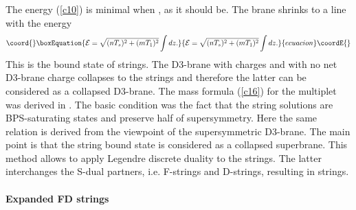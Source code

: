 \documentclass[a4paper,12pt]{article}
\begin{document}
The energy (\ref{c10}) is minimal when \coordHE{}, as it should be. The brane 
shrinks to a line with the energy
\begin{equation}\coord{}\boxEquation{
{\cal E}=\sqrt{(nT_s)^2+(mT_1)^2}\int dz.
\label{c16}
}{
{\cal E}=\sqrt{(nT_s)^2+(mT_1)^2}\int dz.
}{ecuacion}\coordE{}\end{equation}
This is the bound state of \coordHE{} strings. The D3-brane with charges \coordHE{} 
and with no net D3-brane charge collapses to the \coordHE{} strings and 
therefore the latter can be considered as a collapsed D3-brane. The mass 
formula (\ref{c16}) for the \coordHE{} multiplet was derived in 
\cite{17,20}. 
The basic condition was the fact that the string solutions are BPS-saturating 
states and preserve half of supersymmetry. Here the same relation is derived 
from the viewpoint of the supersymmetric D3-brane. The main point is that the 
string bound state is considered as a collapsed superbrane. This 
method allows to apply Legendre discrete duality to the \coordHE{} strings. 
The latter interchanges the S-dual partners, i.e. F-strings and D-strings, 
resulting in \coordHE{} strings.
\paragraph{Expanded FD strings}

\noindent
\end{document}
